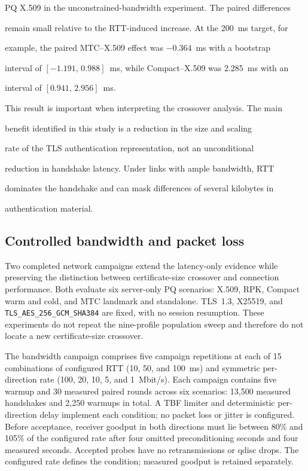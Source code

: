 \documentclass[journal]{IEEEtran}
\begin{document}
PQ X.509 in the unconstrained-bandwidth experiment. The paired differences

remain small relative to the RTT-induced increase. At the 200~ms target, for

example, the paired MTC--X.509 effect was $-0.364$~ms with a bootstrap

interval of $[-1.191,\,0.988]$~ms, while Compact--X.509 was 2.285~ms with an

interval of $[0.941,\,2.956]$~ms.



This result is important when interpreting the crossover analysis. The main

benefit identified in this study is a reduction in the size and scaling

rate of the TLS authentication representation, not an unconditional

reduction in handshake latency. Under links with ample bandwidth, RTT

dominates the handshake and can mask differences of several kilobytes in

authentication material.



\subsection{Controlled bandwidth and packet loss}
\label{sec:bandwidth-loss}

Two completed network campaigns extend the latency-only evidence while preserving the distinction between certificate-size crossover and connection performance. Both evaluate six server-only PQ scenarios: X.509, RPK, Compact warm and cold, and MTC landmark and standalone. TLS~1.3, X25519, and \texttt{TLS\_AES\_256\_GCM\_SHA384} are fixed, with no session resumption. These experiments do not repeat the nine-profile population sweep and therefore do not locate a new certificate-size crossover.

The bandwidth campaign comprises five campaign repetitions at each of 15 combinations of configured RTT (10, 50, and 100~ms) and symmetric per-direction rate (100, 20, 10, 5, and 1~Mbit/s). Each campaign contains five warmup and 30 measured paired rounds across six scenarios: 13,500 measured handshakes and 2,250 warmups in total. A TBF limiter and deterministic per-direction delay implement each condition; no packet loss or jitter is configured. Before acceptance, receiver goodput in both directions must lie between 80\% and 105\% of the configured rate after four omitted preconditioning seconds and four measured seconds. Accepted probes have no retransmissions or qdisc drops. The configured rate defines the condition; measured goodput is retained separately.
\end{document}
